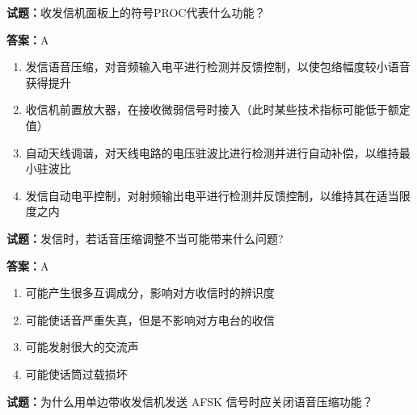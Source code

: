 \documentclass{ctexbook}
\begin{document}




\vspace{1em}

\textbf{试题：}收发信机面板上的符号PROC代表什么功能？ 

\textbf{答案：}A 

\begin{enumerate}[leftmargin=3em]
  \item 发信语音压缩，对音频输入电平进行检测并反馈控制，以使包络幅度较小语音获得提升 

  \item 收信机前置放大器，在接收微弱信号时接入（此时某些技术指标可能低于额定值） 

  \item 自动天线调谐，对天线电路的电压驻波比进行检测并进行自动补偿，以维持最小驻波比 

  \item 发信自动电平控制，对射频输出电平进行检测并反馈控制，以维持其在适当限度之内 

\end{enumerate}





\vspace{1em}

\textbf{试题：}发信时，若话音压缩调整不当可能带来什么问题? 

\textbf{答案：}A 

\begin{enumerate}[leftmargin=3em]
  \item 可能产生很多互调成分，影响对方收信时的辨识度 

  \item 可能使话音严重失真，但是不影响对方电台的收信 

  \item 可能发射很大的交流声 

  \item 可能使话筒过载损坏 

\end{enumerate}





\vspace{1em}

\textbf{试题：}为什么用单边带收发信机发送 AFSK 信号时应关闭语音压缩功能？ 
\end{document}
